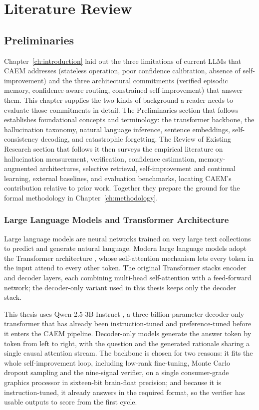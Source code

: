 \chapter{Literature Review}
\label{ch:literature-review}

\section{Preliminaries}

Chapter~\ref{ch:introduction} laid out the three limitations of current LLMs that CAEM addresses (stateless operation, poor confidence calibration, absence of self-improvement) and the three architectural commitments (verified episodic memory, confidence-aware routing, constrained self-improvement) that answer them. This chapter supplies the two kinds of background a reader needs to evaluate those commitments in detail. The Preliminaries section that follows establishes foundational concepts and terminology: the transformer backbone, the hallucination taxonomy, natural language inference, sentence embeddings, self-consistency decoding, and catastrophic forgetting. The Review of Existing Research section that follows it then surveys the empirical literature on hallucination measurement, verification, confidence estimation, memory-augmented architectures, selective retrieval, self-improvement and continual learning, external baselines, and evaluation benchmarks, locating CAEM's contribution relative to prior work. Together they prepare the ground for the formal methodology in Chapter~\ref{ch:methodology}.

\subsection{Large Language Models and Transformer Architecture}

Large language models are neural networks trained on very large text collections to predict and generate natural language. Modern large language models adopt the Transformer architecture \cite{NIPS2017_3f5ee243}, whose self-attention mechanism lets every token in the input attend to every other token. The original Transformer stacks encoder and decoder layers, each combining multi-head self-attention with a feed-forward network; the decoder-only variant used in this thesis keeps only the decoder stack.

This thesis uses Qwen-2.5-3B-Instruct \cite{qwen25}, a three-billion-parameter decoder-only transformer that has already been instruction-tuned and preference-tuned before it enters the CAEM pipeline. Decoder-only models generate the answer token by token from left to right, with the question and the generated rationale sharing a single causal attention stream. The backbone is chosen for two reasons: it fits the whole self-improvement loop, including low-rank fine-tuning, Monte Carlo dropout sampling and the nine-signal verifier, on a single consumer-grade graphics processor in sixteen-bit brain-float precision; and because it is instruction-tuned, it already answers in the required format, so the verifier has usable outputs to score from the first cycle.

